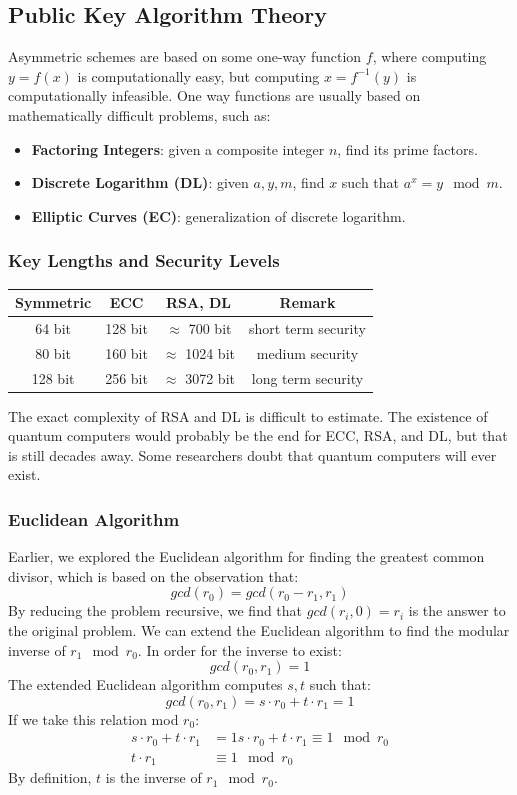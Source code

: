 \documentclass{math}
\begin{document}
\subsection*{Public Key Algorithm Theory}
Asymmetric schemes are based on some one-way function \( f \), where computing
\( y = f(x) \) is computationally easy, but computing \( x = f^{-1}(y) \) is
computationally infeasible. One way functions are usually based on
mathematically difficult problems, such as:
\begin{itemize}
  \item \textbf{Factoring Integers}: given a composite integer \( n \), find its
  prime factors.
  \item \textbf{Discrete Logarithm (DL)}: given \( a,y,m \), find \( x \) such
  that \( a^x = y\mod m \).
  \item \textbf{Elliptic Curves (EC)}: generalization of discrete logarithm.
\end{itemize}

\subsubsection*{Key Lengths and Security Levels}
\begin{center}
  \begin{tabular}{|c|c|c|c|}
    \hline
    Symmetric & ECC & RSA, DL & Remark \\
    \hline
    64 bit & 128 bit & \( \approx \) 700 bit & short term security \\
    \hline
    80 bit & 160 bit & \( \approx \) 1024 bit & medium security \\
    \hline
    128 bit & 256 bit & \( \approx \) 3072 bit &  long term security \\
    \hline
  \end{tabular}
\end{center}
The exact complexity of RSA and DL is difficult to estimate. The existence of
quantum computers would probably be the end for ECC, RSA, and DL, but that is
still decades away. Some researchers doubt that quantum computers will ever
exist.

\subsubsection*{Euclidean Algorithm}
Earlier, we explored the Euclidean algorithm for finding the greatest common
divisor, which is based on the observation that:
\[ gcd(r_0) = gcd(r_0-r_1,r_1) \]
By reducing the problem recursive, we find that \( gcd(r_i,0) = r_i \) is the
answer to the original problem. We can extend the Euclidean algorithm to find
the modular inverse of \( r_1 \mod r_0 \). In order for the inverse to exist:
\[ gcd(r_0,r_1) = 1 \]
The extended Euclidean algorithm computes \( s,t \) such that:
\[ gcd(r_0,r_1) = s\cdot r_0+t\cdot r_1 = 1 \]
If we take this relation mod \( r_0 \):
\begin{align*}
  s\cdot r_0+t\cdot r_1 &= 1
  s\cdot r_0+t\cdot r_1 \equiv 1\mod r_0 \\
  t\cdot r_1 &\equiv 1\mod r_0
\end{align*}
By definition, \( t \) is the inverse of \( r_1 \mod r_0 \).
\end{document}

